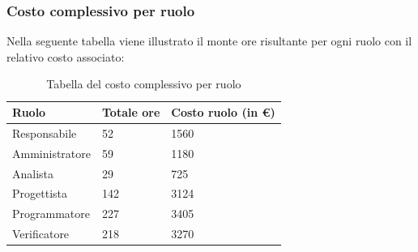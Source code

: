\subsubsection{Costo complessivo per ruolo}
Nella seguente tabella viene illustrato il monte ore risultante per ogni ruolo con il relativo costo associato:
{
\renewcommand{\arraystretch}{2}
\begin{longtable}{ C{3cm} C{2cm} C{4cm}}
\caption{Tabella del costo complessivo per ruolo}\\
\rowcolor{\primaryColor}

\textcolor{\secondaryColor}{\textbf{Ruolo}} & 
\textcolor{\secondaryColor}{\textbf{Totale ore}} & 
\textcolor{\secondaryColor}{\textbf{Costo ruolo (in \euro{})}}\\	
\endhead
        
Responsabile   &  52 & 1560 \\
Amministratore &  59 & 1180 \\
Analista       &  29 & 725 \\
Progettista    &  142 & 3124 \\
Programmatore  &  227 & 3405 \\
Verificatore   &  218 & 3270 \\
        	
\end{longtable}
}

